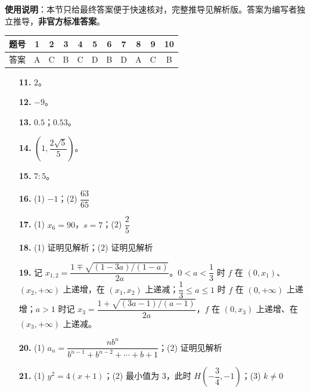 
\begin{gknotice}
\textbf{使用说明}：本节只给最终答案便于快速核对，完整推导见解析版。答案为编写者独立推导，\textbf{非官方标准答案}。
\end{gknotice}

\begin{center}\begin{tabular}{ccccccccccc}
\toprule
题号 & 1 & 2 & 3 & 4 & 5 & 6 & 7 & 8 & 9 & 10 \\
\midrule
答案 & A & C & B & C & D & B & D & A & C & B \\
\bottomrule
\end{tabular}\end{center}

\begin{itemize}[leftmargin=2.6em]
  \item[\textbf{11.}] $2$。
  \item[\textbf{12.}] $-9$。
  \item[\textbf{13.}] $0.5$；$0.53$。
  \item[\textbf{14.}] $\left(1,\dfrac{2\sqrt5}{5}\right)$。
  \item[\textbf{15.}] $7:5$。
\end{itemize}

\begin{itemize}[leftmargin=2.6em]
  \item[\textbf{16.}] (1) $-1$；(2) $\dfrac{63}{65}$
  \item[\textbf{17.}] (1) $x_6=90$，$s=7$；(2) $\dfrac25$
  \item[\textbf{18.}] (1) 证明见解析；(2) 证明见解析
  \item[\textbf{19.}] 记 $x_{1,2}=\dfrac{1\mp\sqrt{(1-3a)/(1-a)}}{2a}$。$0<a<\dfrac13$ 时 $f$ 在 $(0,x_1)$、$(x_2,+\infty)$ 上递增，在 $(x_1,x_2)$ 上递减；$\dfrac13\leqslant a\leqslant1$ 时 $f$ 在 $(0,+\infty)$ 上递增；$a>1$ 时记 $x_3=\dfrac{1+\sqrt{(3a-1)/(a-1)}}{2a}$，$f$ 在 $(0,x_3)$ 上递增、在 $(x_3,+\infty)$ 上递减。
  \item[\textbf{20.}] (1) $a_n=\dfrac{nb^n}{b^{n-1}+b^{n-2}+\cdots+b+1}$；(2) 证明见解析
  \item[\textbf{21.}] (1) $y^2=4(x+1)$；(2) 最小值为 $3$，此时 $H\left(-\dfrac34,-1\right)$；(3) $k\neq0$
\end{itemize}
